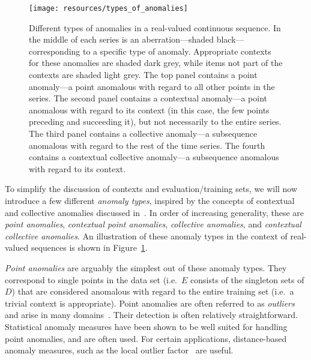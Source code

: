 \begin{figure}[htb]
    \begin{center}
        \texttt{[image: resources/types\_of\_anomalies]}
    \end{center}
    \caption{{\small Different types of anomalies in a real-valued continuous sequence. In the middle of each series is an aberration---shaded black---corresponding to a specific type of anomaly. Appropriate contexts for these anomalies are shaded dark grey, while items not part of the contexts are shaded light grey. The top panel contains a point anomaly---a point anomalous with regard to all other points in the series. The second panel contains a contextual anomaly---a point anomalous with regard to its context (in this case, the few points preceding and succeeding it), but not necessarily to the entire series. The third panel contains a collective anomaly---a subsequence anomalous with regard to the rest of the time series. The fourth contains a contextual collective anomaly---a subsequence anomalous with regard to its context.}}
\label{fig:anomaly_types}
\end{figure}

To simplify the discussion of contexts and evaluation/training sets, we will now introduce a few different \emph{anomaly types}, inspired by the concepts of contextual and collective anomalies discussed in~\cite{chandola}. In order of increasing generality, these are \emph{point anomalies}, \emph{contextual point anomalies}, \emph{collective anomalies}, and \emph{contextual collective anomalies}. An illustration of these anomaly types in the context of real-valued sequences is shown in Figure~\ref{fig:anomaly_types}.

\emph{Point anomalies} are arguably the simplest out of these anomaly types. They correspond to single points in the data set (i.e.\ $E$ consists of the singleton sets of $D$) that are considered anomalous with regard to the entire training set (i.e.\ a trivial context is appropriate). Point anomalies are often referred to as \emph{outliers} and arise in many domains~\cite{eskin}. Their detection is often relatively straightforward. Statistical anomaly measures have been shown to be well suited for handling point anomalies, and are often used. For certain applications, distance-based anomaly measures, such as the local outlier factor~\cite{TODO} are useful.

